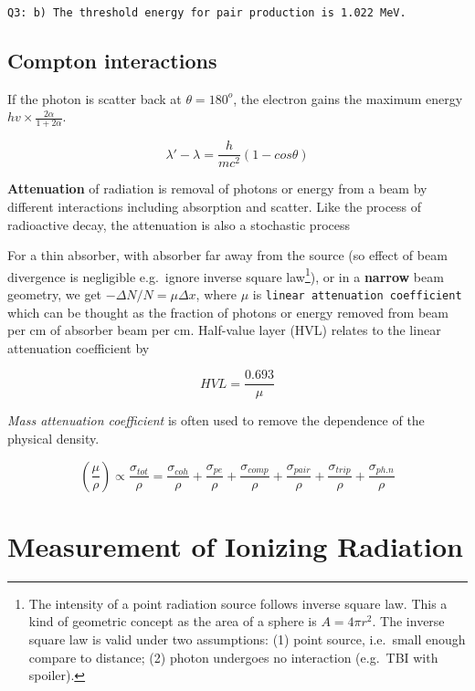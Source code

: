 \documentclass[]{book}
\let\rmarkdownfootnote\footnote%
\def\footnote{\protect\rmarkdownfootnote}
\theoremstyle{definition}
\theoremstyle{definition}
\theoremstyle{definition}
\theoremstyle{remark}
\begin{document}
\texttt{Q3:\ b)\ The\ threshold\ energy\ for\ pair\ production\ is\ 1.022\ MeV.}

\section{Compton interactions}\label{compton-interactions}

If the photon is scatter back at \(\theta = 180^o\), the electron gains
the maximum energy \(hv \times \frac{2\alpha}{1+2\alpha}\).

\begin{equation}
    \lambda'-\lambda = \frac{h}{mc^2}(1-cos\theta)
\end{equation}

\textbf{Attenuation} of radiation is removal of photons or energy from a
beam by different interactions including absorption and scatter. Like
the process of radioactive decay, the attenuation is also a stochastic
process

For a thin absorber, with absorber far away from the source (so effect
of beam divergence is negligible e.g.~ignore inverse square
law\footnote{The intensity of a point radiation source follows inverse
  square law. This a kind of geometric concept as the area of a sphere
  is \(A = 4\pi r^2\). The inverse square law is valid under two
  assumptions: (1) point source, i.e.~small enough compare to distance;
  (2) photon undergoes no interaction (e.g.~TBI with spoiler).}), or in
a \textbf{narrow} beam geometry, we get \(-\Delta N/N = \mu \Delta x\),
where \(\mu\) is \texttt{linear\ attenuation\ coefficient} which can be
thought as the fraction of photons or energy removed from beam per cm of
absorber beam per cm. Half-value layer (HVL) relates to the linear
attenuation coefficient by

\begin{equation}
    HVL = \frac{0.693}{\mu}
\end{equation}

\emph{Mass attenuation coefficient} is often used to remove the
dependence of the physical density.

\begin{equation}
\left(\frac{\mu}{\rho}\right) \propto \frac{\sigma_{tot}}{\rho} =                       \frac{\sigma_{coh}}{\rho}+\frac{\sigma_{pe}}{\rho}+\frac{\sigma_{comp}}{\rho} + 
\frac{\sigma_{pair}}{\rho} + \frac{\sigma_{trip}}{\rho} + \frac{\sigma_{ph.n}}{\rho}
\end{equation}

\chapter{Measurement of Ionizing Radiation}\label{measurement}
\end{document}
